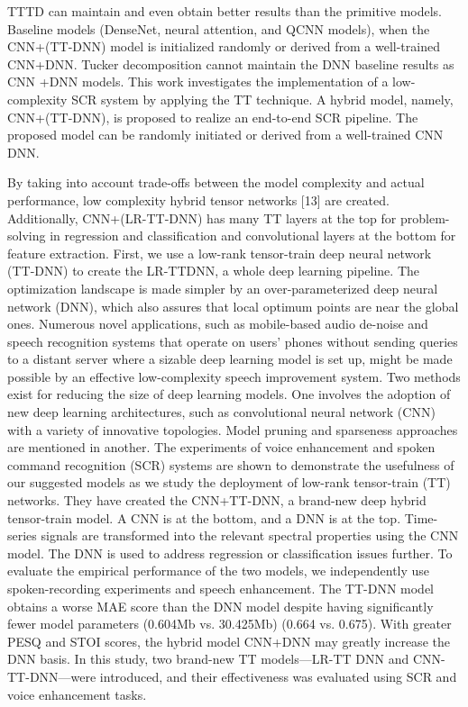 TTTD \parencite{16} can maintain and even obtain better results than the primitive models. Baseline models (DenseNet, neural attention, and QCNN models), when the CNN+(TT-DNN) model is initialized randomly or derived from a well-trained CNN+DNN. Tucker decomposition cannot maintain the DNN baseline results as CNN +DNN models. This work investigates the implementation of a low-complexity SCR system by applying the TT technique. A hybrid model, namely, CNN+(TT-DNN), is proposed to realize an end-to-end SCR pipeline. The proposed model can be randomly initiated or derived from a well-trained CNN \+ DNN.

By taking into account trade-offs between the model complexity and actual performance, low complexity hybrid tensor networks [13] are created. Additionally, CNN+(LR-TT-DNN) has many TT layers at the top for problem-solving in regression and classification and convolutional layers at the bottom for feature extraction. First, we use a low-rank tensor-train deep neural network (TT-DNN) to create the LR-TTDNN, a whole deep learning pipeline. The optimization landscape is made simpler by an over-parameterized deep neural network (DNN), which also assures that local optimum points are near the global ones. Numerous novel applications, such as mobile-based audio de-noise and speech recognition systems that operate on users' phones without sending queries to a distant server where a sizable deep learning model is set up, might be made possible by an effective low-complexity speech improvement system. Two methods exist for reducing the size of deep learning models. One involves the adoption of new deep learning architectures, such as convolutional neural network (CNN) with a variety of innovative topologies. Model pruning and sparseness approaches are mentioned in another. The experiments of voice enhancement and spoken command recognition (SCR) systems are shown to demonstrate the usefulness of our suggested models as we study the deployment of low-rank tensor-train (TT) networks. They have created the CNN+TT-DNN, a brand-new deep hybrid tensor-train model. A CNN is at the bottom, and a DNN is at the top. Time-series signals are transformed into the relevant spectral properties using the CNN model. The DNN is used to address regression or classification issues further. To evaluate the empirical performance of the two models, we independently use spoken-recording experiments and speech enhancement. The TT-DNN model obtains a worse MAE score than the DNN model despite having significantly fewer model parameters (0.604Mb vs. 30.425Mb) (0.664 vs. 0.675). With greater PESQ and STOI scores, the hybrid model CNN+DNN may greatly increase the DNN basis. In this study, two brand-new TT models—LR-TT DNN and CNN-TT-DNN—were introduced, and their effectiveness was evaluated using SCR and voice enhancement tasks.
